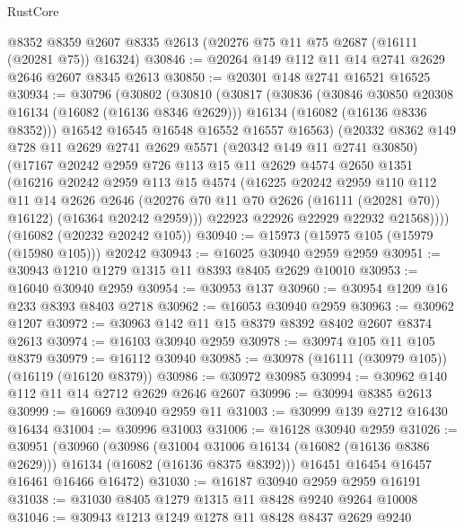 \begin{lexlean}{RustCore}
\begin{coremodule}
    @8352
    @8359
    @2607
    @8335
    @2613
    (@20276 @75 @11 @75 @2687 (@16111 (@20281 @75)) @16324)
@30846 := @20264 @149 @112 @11 @14 @2741 @2629 @2646 @2607 @8345 @2613
@30850 := @20301 @148 @2741 @16521 @16525
@30934 := @30796
    (@30802
      (@30810
        (@30817
          (@30836
            (@30846 @30850 @20308 @16134 (@16082 (@16136 @8346 @2629)))
            @16134
            (@16082 (@16136 @8336 @8352)))
          @16542
          @16545
          @16548
          @16552
          @16557
          @16563)
        (@20332
          @8362
          @149
          @728
          @11
          @2629
          @2741
          @2629
          @5571
          (@20342 @149 @11 @2741 @30850)
          (@17167
            @20242
            @2959
            @726
            @113
            @15
            @11
            @2629
            @4574
            @2650
            @1351
            (@16216
              @20242
              @2959
              @113
              @15
              @4574
              (@16225
                @20242
                @2959
                @110
                @112
                @11
                @14
                @2626
                @2646
                (@20276 @70 @11 @70 @2626 (@16111 (@20281 @70)) @16122)
                (@16364 @20242 @2959)))
            @22923
            @22926
            @22929
            @22932
            @21568))))
    (@16082 (@20232 @20242 @105))
@30940 := @15973 (@15975 @105 (@15979 (@15980 @105))) @20242
@30943 := @16025 @30940 @2959 @2959
@30951 := @30943 @1210 @1279 @1315 @11 @8393 @8405 @2629 @10010
@30953 := @16040 @30940 @2959
@30954 := @30953 @137
@30960 := @30954 @1209 @16 @233 @8393 @8403 @2718
@30962 := @16053 @30940 @2959
@30963 := @30962 @1207
@30972 := @30963 @142 @11 @15 @8379 @8392 @8402 @2607 @8374 @2613
@30974 := @16103 @30940 @2959
@30978 := @30974 @105 @11 @105 @8379
@30979 := @16112 @30940
@30985 := @30978 (@16111 (@30979 @105)) (@16119 (@16120 @8379))
@30986 := @30972 @30985
@30994 := @30962 @140 @112 @11 @14 @2712 @2629 @2646 @2607
@30996 := @30994 @8385 @2613
@30999 := @16069 @30940 @2959 @11
@31003 := @30999 @139 @2712 @16430 @16434
@31004 := @30996 @31003
@31006 := @16128 @30940 @2959
@31026 := @30951
    (@30960
      (@30986
        (@31004 @31006 @16134 (@16082 (@16136 @8386 @2629)))
        @16134
        (@16082 (@16136 @8375 @8392)))
      @16451
      @16454
      @16457
      @16461
      @16466
      @16472)
@31030 := @16187 @30940 @2959 @2959 @16191
@31038 := @31030 @8405 @1279 @1315 @11 @8428 @9240 @9264 @10008
@31046 := @30943 @1213 @1249 @1278 @11 @8428 @8437 @2629 @9240

\end{coremodule}
\end{lexlean}
